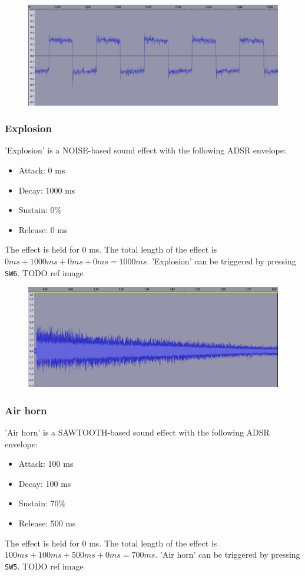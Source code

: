 \begin{figure}[H]
	\includegraphics[width = \textwidth]{images/SW4zoom.png}
	\caption{}
	\label{img-sw4zoom}
\end{figure}

\subsubsection{Explosion}

'Explosion' is a NOISE-based sound effect with the following ADSR envelope:
\begin{itemize}
	\item{Attack: 0 ms}
	\item{Decay: 1000 ms}
	\item{Sustain: 0\%}
	\item{Release: 0 ms}
\end{itemize}
The effect is held for 0 ms.
The total length of the effect is $0 ms + 1000 ms + 0 ms + 0 ms = 1000 ms$.
'Explosion' can be triggered by pressing \texttt{SW6}.
TODO ref image

\begin{figure}[H]
	\includegraphics[width = \textwidth]{images/SW6.png}
	\caption{}
	\label{img-sw6}
\end{figure}


\subsubsection{Air horn}
'Air horn' is a SAWTOOTH-based sound effect with the following ADSR envelope:
\begin{itemize}
	\item{Attack: 100 ms}
	\item{Decay: 100 ms}
	\item{Sustain: 70\%}
	\item{Release: 500 ms}
\end{itemize}
The effect is held for 0 ms.
The total length of the effect is $100 ms + 100 ms + 500 ms + 0 ms = 700 ms$.
'Air horn' can be triggered by pressing \texttt{SW5}.
TODO ref image

